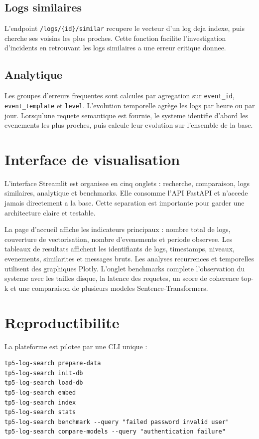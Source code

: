 \documentclass[12pt,a4paper]{article}
\begin{document}
\subsection{Logs similaires}

L'endpoint \texttt{/logs/\{id\}/similar} recupere le vecteur d'un log deja indexe, puis cherche ses
voisins les plus proches. Cette fonction facilite l'investigation d'incidents en retrouvant les logs
similaires a une erreur critique donnee.

\subsection{Analytique}

Les groupes d'erreurs frequentes sont calcules par agregation sur \texttt{event\_id},
\texttt{event\_template} et \texttt{level}. L'evolution temporelle agr\`ege les logs par heure ou par
jour. Lorsqu'une requete semantique est fournie, le systeme identifie d'abord les evenements les plus
proches, puis calcule leur evolution sur l'ensemble de la base.

\section{Interface de visualisation}

L'interface Streamlit est organisee en cinq onglets : recherche, comparaison, logs similaires,
analytique et benchmarks. Elle consomme l'API FastAPI et n'accede jamais directement a la base.
Cette separation est importante pour garder une architecture claire et testable.

La page d'accueil affiche les indicateurs principaux : nombre total de logs, couverture de
vectorisation, nombre d'evenements et periode observee. Les tableaux de resultats affichent les
identifiants de logs, timestamps, niveaux, evenements, similarites et messages bruts. Les analyses
recurrences et temporelles utilisent des graphiques Plotly. L'onglet benchmarks complete
l'observation du systeme avec les tailles disque, la latence des requetes, un score de coherence
top-k et une comparaison de plusieurs modeles Sentence-Transformers.

\section{Reproductibilite}

La plateforme est pilotee par une CLI unique :

\begin{lstlisting}
tp5-log-search prepare-data
tp5-log-search init-db
tp5-log-search load-db
tp5-log-search embed
tp5-log-search index
tp5-log-search stats
tp5-log-search benchmark --query "failed password invalid user"
tp5-log-search compare-models --query "authentication failure"
\end{lstlisting}
\end{document}
